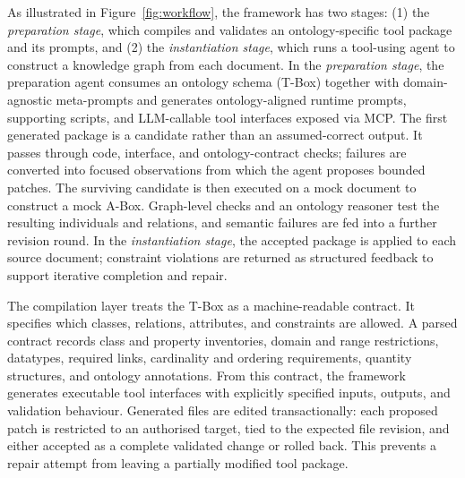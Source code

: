As illustrated in Figure~\ref{fig:workflow}, the framework has two stages: (1) the \emph{preparation stage}, which compiles and validates an ontology-specific tool package and its prompts, and (2) the \emph{instantiation stage}, which runs a tool-using agent to construct a knowledge graph from each document. In the \emph{preparation stage}, the preparation agent consumes an ontology schema (T-Box) together with domain-agnostic meta-prompts and generates ontology-aligned runtime prompts, supporting scripts, and LLM-callable tool interfaces exposed via MCP. The first generated package is a candidate rather than an assumed-correct output. It passes through code, interface, and ontology-contract checks; failures are converted into focused observations from which the agent proposes bounded patches. The surviving candidate is then executed on a mock document to construct a mock A-Box. Graph-level checks and an ontology reasoner test the resulting individuals and relations, and semantic failures are fed into a further revision round. In the \emph{instantiation stage}, the accepted package is applied to each source document; constraint violations are returned as structured feedback to support iterative completion and repair.

The compilation layer treats the T-Box as a machine-readable contract. It specifies which classes, relations, attributes, and constraints are allowed. A parsed contract records class and property inventories, domain and range restrictions, datatypes, required links, cardinality and ordering requirements, quantity structures, and ontology annotations. From this contract, the framework generates executable tool interfaces with explicitly specified inputs, outputs, and validation behaviour. Generated files are edited transactionally: each proposed patch is restricted to an authorised target, tied to the expected file revision, and either accepted as a complete validated change or rolled back. This prevents a repair attempt from leaving a partially modified tool package.

